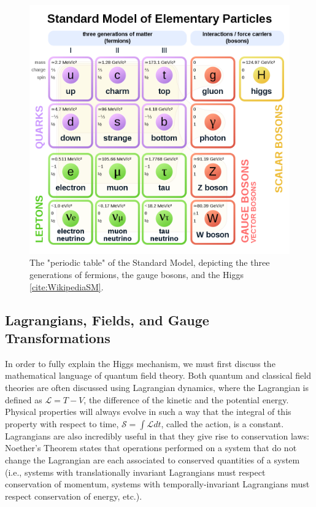 \begin{figure}
\includegraphics[width=\linewidth]{figures/theory_chapter/SM.png}
\caption{The "periodic table" of the Standard Model, depicting the three generations of fermions, the gauge bosons, and the Higgs \ref{cite:WikipediaSM}.}
\end{figure}

\subsection{Lagrangians, Fields, and Gauge Transformations}\label{sec:Lagrangians}

In order to fully explain the Higgs mechanism, we must first discuss the mathematical language of quantum field theory. Both quantum and classical field theories are often discussed using Lagrangian dynamics, where the Lagrangian is defined as  $\mathcal{L} = T - V$, the difference of the kinetic and the potential energy. Physical properties will always evolve in such a way that the integral of this property with respect to time, $\mathcal{S} = \int \mathcal{L} dt$, called the action, is a constant. Lagrangians are also incredibly useful in that they give rise to conservation laws: Noether's Theorem states that operations performed on a system that do not change the Lagrangian are each associated to conserved quantities of a system (i.e., systems with translationally invariant Lagrangians must respect conservation of momentum, systems with temporally-invariant Lagrangians must respect conservation of energy, etc.).

